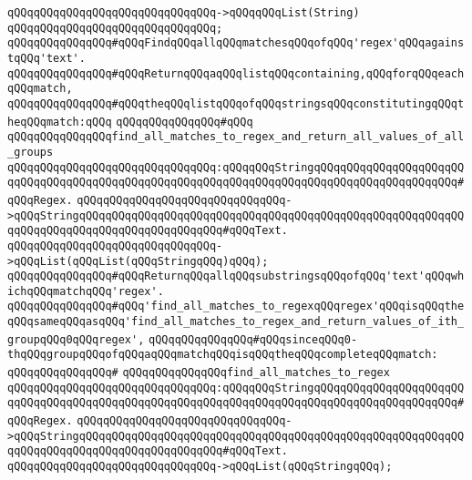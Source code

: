 \verb|qQQqqQQqqQQqqQQqqQQqqQQqqQQqqQQq->qQQqqQQqList(String)|\newline
\verb|qQQqqQQqqQQqqQQqqQQqqQQqqQQqqQQq;|\newline
\newline
\verb|qQQqqQQqqQQqqQQq#qQQqFindqQQqallqQQqmatchesqQQqofqQQq'regex'qQQqagainstqQQq'text'.|\newline
\verb|qQQqqQQqqQQqqQQq#qQQqReturnqQQqaqQQqlistqQQqcontaining,qQQqforqQQqeachqQQqmatch,|\newline
\verb|qQQqqQQqqQQqqQQq#qQQqtheqQQqlistqQQqofqQQqstringsqQQqconstitutingqQQqtheqQQqmatch:qQQq|\newline
\verb|qQQqqQQqqQQqqQQq#qQQq|\newline
\verb|qQQqqQQqqQQqqQQqfind_all_matches_to_regex_and_return_all_values_of_all_groups|\newline
\verb|qQQqqQQqqQQqqQQqqQQqqQQqqQQqqQQq:qQQqqQQqStringqQQqqQQqqQQqqQQqqQQqqQQqqQQqqQQqqQQqqQQqqQQqqQQqqQQqqQQqqQQqqQQqqQQqqQQqqQQqqQQqqQQqqQQqqQQq#qQQqRegex.|\newline
\verb|qQQqqQQqqQQqqQQqqQQqqQQqqQQqqQQq->qQQqStringqQQqqQQqqQQqqQQqqQQqqQQqqQQqqQQqqQQqqQQqqQQqqQQqqQQqqQQqqQQqqQQqqQQqqQQqqQQqqQQqqQQqqQQqqQQq#qQQqText.|\newline
\verb|qQQqqQQqqQQqqQQqqQQqqQQqqQQqqQQq->qQQqList(qQQqList(qQQqStringqQQq)qQQq);|\newline
\newline
\verb|qQQqqQQqqQQqqQQq#qQQqReturnqQQqallqQQqsubstringsqQQqofqQQq'text'qQQqwhichqQQqmatchqQQq'regex'.|\newline
\verb|qQQqqQQqqQQqqQQq#qQQq'find_all_matches_to_regexqQQqregex'qQQqisqQQqtheqQQqsameqQQqasqQQq'find_all_matches_to_regex_and_return_values_of_ith_groupqQQq0qQQqregex',|\newline
\verb|qQQqqQQqqQQqqQQq#qQQqsinceqQQq0-thqQQqgroupqQQqofqQQqaqQQqmatchqQQqisqQQqtheqQQqcompleteqQQqmatch:|\newline
\verb|qQQqqQQqqQQqqQQq#|\newline
\verb|qQQqqQQqqQQqqQQqfind_all_matches_to_regex|\newline
\verb|qQQqqQQqqQQqqQQqqQQqqQQqqQQqqQQq:qQQqqQQqStringqQQqqQQqqQQqqQQqqQQqqQQqqQQqqQQqqQQqqQQqqQQqqQQqqQQqqQQqqQQqqQQqqQQqqQQqqQQqqQQqqQQqqQQqqQQq#qQQqRegex.|\newline
\verb|qQQqqQQqqQQqqQQqqQQqqQQqqQQqqQQq->qQQqStringqQQqqQQqqQQqqQQqqQQqqQQqqQQqqQQqqQQqqQQqqQQqqQQqqQQqqQQqqQQqqQQqqQQqqQQqqQQqqQQqqQQqqQQqqQQq#qQQqText.|\newline
\verb|qQQqqQQqqQQqqQQqqQQqqQQqqQQqqQQq->qQQqList(qQQqStringqQQq);|\newline
